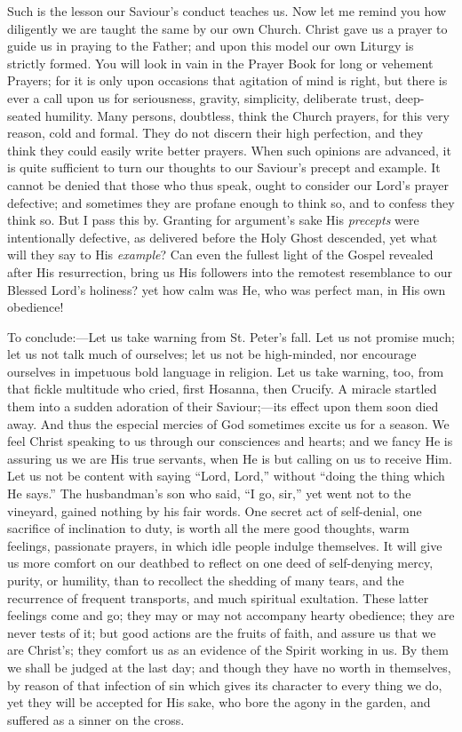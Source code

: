 Such is the lesson our Saviour's conduct teaches us.
Now let me remind you how diligently we are taught the
same by our own Church. Christ gave us a prayer to guide
us in praying to the Father; and upon this model our own
Liturgy is strictly formed. You will look in vain in the
Prayer Book for long or vehement Prayers; for it is only
upon occasions that agitation of mind is right, but there
is ever a call upon us for seriousness, gravity,
simplicity, deliberate trust, deep-seated humility. Many
persons, doubtless, think the Church prayers, for this
very reason, cold and formal. They do not discern their
high perfection, and they think they could easily write
better prayers. When such opinions are advanced, it is
quite sufficient to turn our thoughts to our Saviour's
precept and example. It cannot be denied that those who
thus speak, ought to consider our Lord's prayer
defective; and sometimes they are profane enough to think
so, and to confess they think so. But I pass this by.
Granting for argument's sake His \emph{precepts} were
intentionally defective, as delivered before the Holy
Ghost descended, yet what will they say to His \emph{example}?
Can even the fullest light of the Gospel revealed after
His resurrection, bring us His followers into the
remotest resemblance to our Blessed Lord's holiness? yet
how calm was He, who was perfect man, in His own
obedience!

To conclude:—Let us take warning from St. Peter's
fall. Let us not promise much; let us not talk much of
ourselves; let us not be high-minded, nor encourage
ourselves in impetuous bold language in religion. Let us
take warning, too, from that fickle multitude who cried, first Hosanna, then Crucify. A miracle startled
them into a sudden adoration of their Saviour;—its
effect upon them soon died away. And thus the especial
mercies of God sometimes excite us for a season. We feel
Christ speaking to us through our consciences and hearts;
and we fancy He is assuring us we are His true servants,
when He is but calling on us to receive Him. Let us not
be content with saying ``Lord, Lord,'' without
``doing the thing which He says.'' The
husbandman's son who said, ``I go, sir,'' yet
went not to the vineyard, gained nothing by his fair
words. One secret act of self-denial, one sacrifice of
inclination to duty, is worth all the mere good thoughts,
warm feelings, passionate prayers, in which idle people
indulge themselves. It will give us more comfort on our
deathbed to reflect on one deed of self-denying mercy,
purity, or humility, than to recollect the shedding of
many tears, and the recurrence of frequent transports,
and much spiritual exultation. These latter feelings come
and go; they may or may not accompany hearty obedience;
they are never tests of it; but good actions are the
fruits of faith, and assure us that we are Christ's; they
comfort us as an evidence of the Spirit working in us. By
them we shall be judged at the last day; and though they
have no worth in themselves, by reason of that infection
of sin which gives its character to every thing we do,
yet they will be accepted for His sake, who bore the
agony in the garden, and suffered as a sinner on the
cross.

